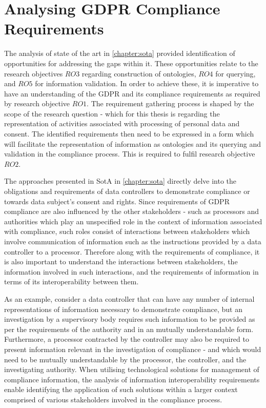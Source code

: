 \chapter{Analysing GDPR Compliance Requirements}
\label{chapter:information}

The analysis of state of the art in \autoref{chapter:sota} provided identification of opportunities for addressing the gaps within it.
These opportunities relate to the research objectives $RO3$ regarding construction of ontologies, $RO4$ for querying, and $RO5$ for information validation.
In order to achieve these, it is imperative to have an understanding of the GDPR and its compliance requirements as required by research objective $RO1$.
The requirement gathering process is shaped by the scope of the research question - which for this thesis is regarding the representation of activities associated with processing of personal data and consent.
The identified requirements then need to be expressed in a form which will facilitate the representation of information as ontologies and its querying and validation in the compliance process. This is required to fulfil research objective $RO2$.

The approaches presented in SotA in \autoref{chapter:sota} directly delve into the obligations and requirements of data controllers to demonstrate compliance or towards data subject's consent and rights.
Since requirements of GDPR compliance are also influenced by the other stakeholders - such as processors and authorities which play an unspecified role in the context of information associated with compliance, such roles consist of interactions between stakeholders which involve communication of information such as the instructions provided by a data controller to a processor.
Therefore along with the requirements of compliance, it is also important to understand the interactions between stakeholders, the information involved in such interactions, and the requirements of information in terms of its interoperability between them.

As an example, consider a data controller that can have any number of internal representations of information necessary to demonstrate compliance, but an investigation by a supervisory body requires such information to be provided as per the requirements of the authority and in an mutually understandable form. Furthermore, a processor contracted by the controller may also be required to present information relevant in the investigation of compliance - and which would need to be mutually understandable by the processor, the controller, and the investigating authority.
When utilising technological solutions for management of compliance information, the analysis of information interoperability requirements enable identifying the application of such solutions within a larger context comprised of various stakeholders involved in the compliance process.

